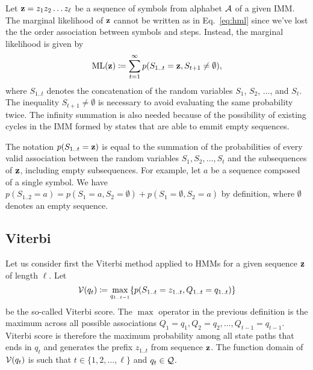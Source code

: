 Let $\mathbf{z}=z_1z_2 \dots z_\ell$ be a sequence of symbols from alphabet $\mathcal{A}$ of a given IMM.\@
The marginal likelihood of $\mathbf{z}$ cannot be written as in Eq.~\eqref{eq:hml} since
we've lost the the order association between symbols and steps.
Instead, the marginal likelihood is given by
\begin{equation}\label{eq:ml}
  \mathrm{ML}(\mathbf{z}) \coloneqq \sum_{t=1}^{\infty} p(S_{1..t}=\mathbf{z}, S_{t+1}\neq \emptyset),
\end{equation}
where $S_{1..t}$ denotes the concatenation of the random variables $S_1$, $S_2$, $\dots$, and $S_t$.
The inequality $S_{t+1}\neq \emptyset$ is necessary to avoid evaluating the same probability twice.
The infinity summation is also needed because of the possibility of existing cycles in the IMM
formed by states that are able to emmit empty sequences.

\begin{remark}
  The notation $p(S_{1..t}=\mathbf{z})$ is equal to the summation of the probabilities of every valid
  association between the random variables $S_1, S_2, \dots, S_t$ and the subsequences of $\mathbf{z}$,
  including empty subsequences. For example, let $a$ be a sequence composed of a single symbol. We
  have $p(S_{1..2}=a) = p(S_1=a, S_2=\emptyset) + p(S_1=\emptyset, S_2=a)$ by definition, where
  $\emptyset$ denotes an empty sequence.
\end{remark}

\subsection{Viterbi}

Let us consider first the Viterbi method applied to HMMs for a given sequence $\mathbf{z}$ of length
$\ell$.
Let
\begin{equation*}
  \mathcal{V}(q_t) \coloneqq \underset{q_{1..t-1}}{\max} \{ p(S_{1..t}=z_{1..t}, Q_{1..t}=q_{1..t}) \}
\end{equation*}
be the so-called Viterbi score. The $\max$ operator in the previous definition is the maximum across
all possible associations $Q_1=q_1, Q_2=q_2, \dots, Q_{t-1}=q_{t-1}$. Viterbi score is therefore the
maximum probability among all state paths that ends in $q_t$ and generates the prefix $z_{1..t}$
from sequence $\mathbf{z}$. The function domain of $\mathcal{V}(q_t)$ is such that $t \in \{1, 2, \dots,
\ell\}$ and $q_t \in \mathcal{Q}$.

